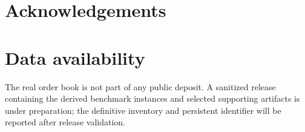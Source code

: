 \documentclass[review,authoryear]{elsarticle}
\newcommand{\todo}[1]{}
\newcommand{\todo}[1]{\textcolor{red}{\textbf{[TODO: #1]}}}
\begin{document}








\section*{Acknowledgements}
\todo{Funding agencies (CNPq/FAPESP/CAPES?); company acknowledgement
thank GAMS academic license if applicable.}

\section*{Data availability}
The real order book is not part of any public deposit. A sanitized
release containing the derived benchmark instances and selected
supporting artifacts is under preparation; the definitive inventory
and persistent identifier will be reported after release validation.



\end{document}
